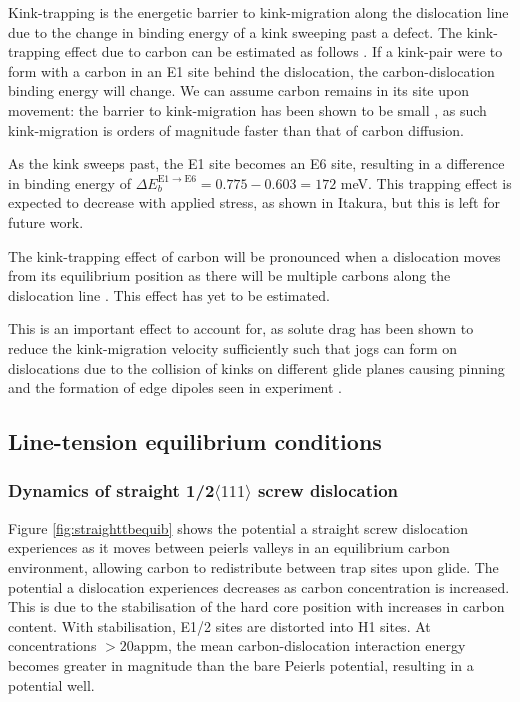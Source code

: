 \documentclass[a4paper,11pt]{article}
\begin{document}
Kink-trapping is the energetic barrier to kink-migration along the dislocation line
due to the change in binding energy of a kink sweeping past a defect. The
kink-trapping effect due to carbon can be estimated as follows
\cite{itakura13_effec_hydrog_atoms_screw_disloc}. If a
kink-pair were to form with a carbon in an E1 site behind the dislocation, the carbon-dislocation binding
energy will change. We can assume carbon remains in its
site upon movement: the barrier to kink-migration has been shown to be small
\cite{itakura13_effec_hydrog_atoms_screw_disloc,Simpson2019,Gong2020}, as such kink-migration is
orders of magnitude faster than that of carbon diffusion.

As the kink sweeps past, the E1 site becomes an E6 site, resulting in a
difference in binding energy of \(\Delta E_b^{\text{E}1\rightarrow
     \text{E}6} = 0.775 - 0.603 = 172\) meV. This trapping effect is expected to
decrease with applied stress, as shown in Itakura, but this is left for
future work.

The kink-trapping effect of carbon will be pronounced when a dislocation
moves from its equilibrium position as there will be multiple carbons along
the dislocation line \cite{Luthi2019}. This effect has yet to be estimated.

This is an important effect to account for, as solute drag has been shown to reduce
the kink-migration velocity sufficiently such that
jogs can form on dislocations due to the collision of kinks on different glide
planes causing pinning and the formation of edge dipoles seen in experiment \cite{Gong2020,Katzarov2017b}.

\subsection{Line-tension equilibrium conditions}
\label{sec:orga08429b}

\subsubsection{Dynamics of straight 1/2\(\langle 111 \rangle\) screw dislocation}
\label{sec:org9acb9ef}

Figure \ref{fig:straighttbequib} shows the potential a straight screw
dislocation experiences as it moves between peierls valleys in an
equilibrium carbon environment, allowing carbon to redistribute between trap
sites upon glide. The potential a dislocation experiences decreases as
carbon concentration is increased. This is due to the stabilisation of the
hard core position with increases in carbon content. With stabilisation,
E1/2 sites are distorted into H1 sites. At concentrations \(\gt
    20\text{appm}\), the mean carbon-dislocation interaction energy becomes
greater in magnitude than the bare Peierls potential, resulting in a
potential well.
\end{document}
